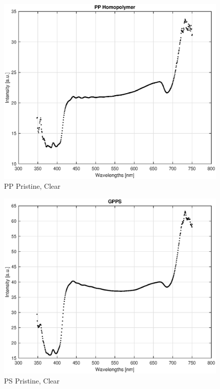 \begin{appendices}
\begin{figure}
    \centering
    \includegraphics[width = 12cm]{Images/appendix/pp-pristine-clear.eps}
    \caption[$\; \:$PP Pristine]{PP Pristine, Clear}
    \label{fig:pp-clear}
\end{figure}

\begin{figure}
    \centering
    \includegraphics[width = 12cm]{Images/appendix/ps-pristine-clear.eps}
    \caption[$\; \:$PS Pristine]{PS Pristine, Clear}
    \label{fig:ps-clear}
\end{figure}


\end{appendices}
